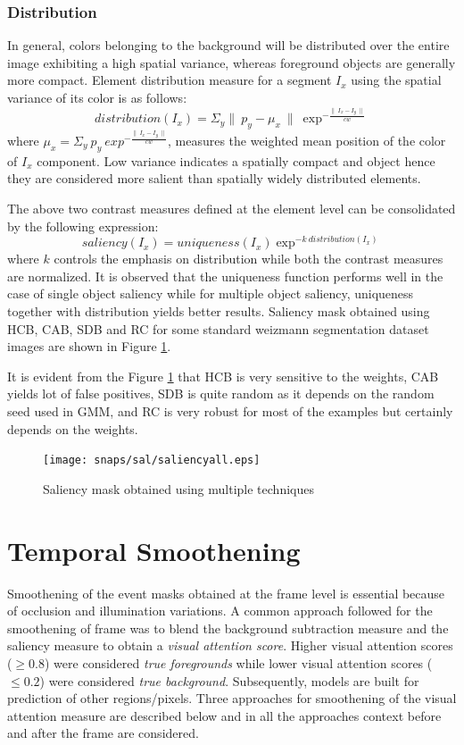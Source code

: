 \subsubsection{Distribution}
In general, colors belonging to the background will be distributed over the entire image exhibiting a high spatial variance, whereas foreground objects are generally more compact.  Element distribution measure for a segment $I_{x}$ using the spatial variance of its color is as follows:
$$distribution(I_{x}) = \Sigma_{y} \parallel~p_{y} -\mu_{x}~\parallel~\exp^{-\frac{\parallel~I_{x} - I_{y}~\parallel}{cw}}$$ 
where $\mu_{x} = \Sigma_{y}~p_{y}~exp^{-\frac{\parallel~I_{x} - I_{y}~\parallel}{cw}}$, measures the weighted mean position of the color of $I_{x}$ component.  Low variance indicates a spatially compact and object hence they are considered more salient than spatially widely distributed elements.

\par The above two contrast measures defined at the element level can be consolidated by the following expression:
$$saliency(I_{x}) = uniqueness(I_{x}) \exp^{-k~distribution(I_{x})}$$
where $k$ controls the emphasis on distribution while both the contrast measures are normalized. It is observed that the uniqueness function performs well in the case of single object saliency while for multiple object saliency, uniqueness together with distribution yields better results.  Saliency mask obtained using HCB, CAB, SDB and RC for some standard weizmann segmentation dataset images are shown in Figure \ref{fig:sal}.
\par It is evident from the Figure \ref{fig:sal} that HCB is very sensitive to the weights, CAB yields lot of false positives, SDB is quite random as it depends on the random seed used in GMM, and RC is very robust for most of the examples but certainly depends on the weights.

\begin{figure}[htpb]
   \begin{center}
	    \texttt{[image: snaps/sal/saliencyall.eps]}     
     \caption {Saliency mask obtained using multiple techniques}
   \label{fig:sal}
   \end{center}
 \end{figure}
 \section{Temporal Smoothening}
  \label{sec:ts}
Smoothening of the event masks obtained at the frame level is essential because of occlusion and illumination variations.  A common approach followed for the smoothening of frame was to blend the background subtraction measure and the saliency measure to obtain a \textit{visual attention score}. Higher visual attention scores ($\geqslant0.8$) were considered \textit{true foregrounds} while lower visual attention scores ($\leqslant0.2$)  were considered \textit{true background}.  Subsequently, models are built for prediction of other regions/pixels.  Three approaches for smoothening of the visual attention measure are described below and in all the approaches context before and after the frame are considered.

